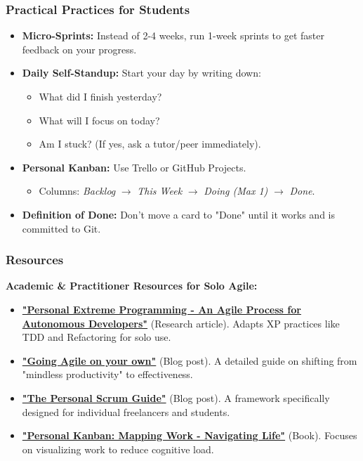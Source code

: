 \documentclass[xcolor=table]{beamer}
\begin{document}
\begin{frame}
    \frametitle{Practical Practices for Students}
    \begin{itemize}
        \item \textbf{Micro-Sprints:} Instead of 2-4 weeks, run 1-week sprints to get faster feedback on your progress.
        \item \textbf{Daily Self-Standup:} Start your day by writing down:
        \begin{itemize}
            \item What did I finish yesterday?
            \item What will I focus on today?
            \item Am I stuck? (If yes, ask a tutor/peer immediately).
        \end{itemize}
        \item \textbf{Personal Kanban:} Use Trello or GitHub Projects.
        \begin{itemize}
            \item Columns: \textit{Backlog} $\rightarrow$ \textit{This Week} $\rightarrow$ \textit{Doing (Max 1)} $\rightarrow$ \textit{Done}.
        \end{itemize}
        \item \textbf{Definition of Done:} Don't move a card to "Done" until it works and is committed to Git.
    \end{itemize}
\end{frame}

\begin{frame}
    \frametitle{Resources}
    \small
    \textbf{Academic \& Practitioner Resources for Solo Agile:}
    \vspace{0.2cm}
    \begin{itemize}
        \item \textbf{
        \href{https://files01.core.ac.uk/download/pdf/213561322.pdf}{"Personal Extreme Programming - An Agile Process for Autonomous Developers"}} (Research article). Adapts XP practices like TDD and Refactoring for solo use.
        \item \textbf{
        \href{https://www.agilesherpas.com/blog/going-agile-alone}{"Going Agile on your own"}} (Blog post). A detailed guide on shifting from "mindless productivity" to effectiveness.
        \item \textbf{
        \href{https://chrisisagile.com/personal-scrum-guide/}{"The Personal Scrum Guide"}} (Blog post). A framework specifically designed for individual freelancers and students.
        \item \textbf{
        \href{https://annas-archive.li/md5/69aa40c50001a4197b993ec0f5a52f53}{"Personal Kanban: Mapping Work - Navigating Life"}} (Book). Focuses on visualizing work to reduce cognitive load.
    \end{itemize}
\end{frame}
\end{document}
